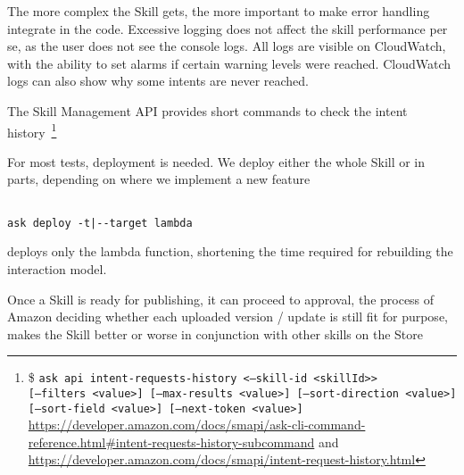 The more complex the Skill gets, the more important to make error handling integrate in the code. Excessive logging does not affect the skill performance per se, as the user does not see the console logs. %
All logs are visible on CloudWatch, with the ability to set alarms if certain warning levels were reached. CloudWatch logs can also show why some intents are never reached.




The Skill Management API provides short commands to check the intent history~\footnote{\$ \texttt{ask api intent-requests-history <--skill-id <skillId>>}\\ \texttt{[--filters <value>] [--max-results <value>] [--sort-direction <value>] }
\texttt{[--sort-field <value>] [--next-token <value>]}\\


\url{https://developer.amazon.com/docs/smapi/ask-cli-command-reference.html\#intent-requests-history-subcommand} and \\ \url{https://developer.amazon.com/docs/smapi/intent-request-history.html}
}





For most tests, deployment is needed.
We deploy either the whole Skill or in parts, depending on where we implement a new feature

\begin{verbatim}

ask deploy -t|--target lambda
\end{verbatim}

deploys only the lambda function, shortening the time required for rebuilding the interaction model.

Once a Skill is ready for publishing, it can proceed to approval, 
the process of Amazon deciding whether each uploaded version / update is still fit for purpose, makes the Skill better or worse in conjunction with other skills on the Store %





